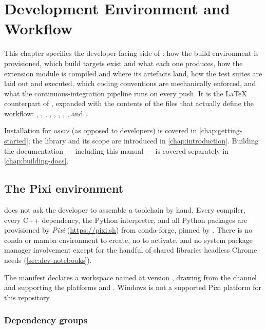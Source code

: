 \chapter{Development Environment and Workflow}
\label{chap:development}

This chapter specifies the developer-facing side of \lupnt{}: how the build
environment is provisioned, which build targets exist and what each one
produces, how the \pylupnt{} extension module is compiled and where its
artefacts land, how the test suites are laid out and executed, which coding
conventions are mechanically enforced, and what the continuous-integration
pipeline runs on every push. It is the LaTeX counterpart of
, expanded with the contents of the files that
actually define the workflow: , ,
, ,
, ,
, , and .

Installation for \emph{users} (as opposed to developers) is covered in
\cref{chap:getting-started}; the library and its scope are introduced in
\cref{chap:introduction}. Building the documentation --- including this manual
--- is covered separately in \cref{chap:building-docs}.

\section{The Pixi environment}
\label{sec:dev-environment}

\lupnt{} does not ask the developer to assemble a toolchain by hand. Every
compiler, every C++ dependency, the Python interpreter, and all Python packages
are provisioned by \emph{Pixi} (\url{https://pixi.sh}) from conda-forge, pinned
by . There is no conda or mamba environment to create, no
 to activate, and no system package manager involvement
except for the handful of shared libraries headless Chrome needs
(\cref{sec:dev-notebooks}).

The manifest  declares a workspace named  at
version , drawing from the  channel and
supporting the platforms  and . Windows is not
a supported Pixi platform for this repository.

\subsection{Dependency groups}
\label{sec:dev-deps}

